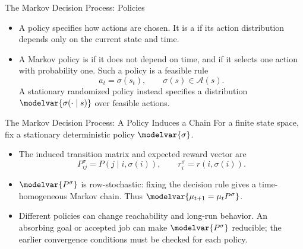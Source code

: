 \begin{frame}{The Markov Decision Process: Policies}
\small
\begin{itemize}
  \item A policy specifies how actions are chosen. It is a  if its action distribution depends only on the current state and time.
  \item A Markov policy is  if it does not depend on time, and  if it selects one action with probability one. Such a policy is a feasible rule
  \[a_t=\sigma(s_t),\qquad \sigma(s)\in\mathcal A(s).\]
  A stationary randomized policy instead specifies a distribution \(\modelvar{\sigma(\cdot\mid s)}\) over feasible actions.
\end{itemize}
\end{frame}

\begin{frame}{The Markov Decision Process: A Policy Induces a Chain}
\small
For a finite state space, fix a stationary deterministic policy \(\modelvar{\sigma}\).
\begin{itemize}
  \item The induced transition matrix and expected reward vector are
  \[P^\sigma_{ij}=P(j\mid i,\sigma(i)),\qquad r^\sigma_i=r(i,\sigma(i)).\]
  \item \(\modelvar{P^\sigma}\) is row-stochastic: fixing the decision rule gives a time-homogeneous Markov chain. Thus \(\modelvar{\mu_{t+1}=\mu_tP^\sigma}\).
  \item Different policies can change reachability and long-run behavior. An absorbing goal or accepted job can make \(\modelvar{P^\sigma}\) reducible; the earlier convergence conditions must be checked for each policy.
\end{itemize}
\end{frame}


